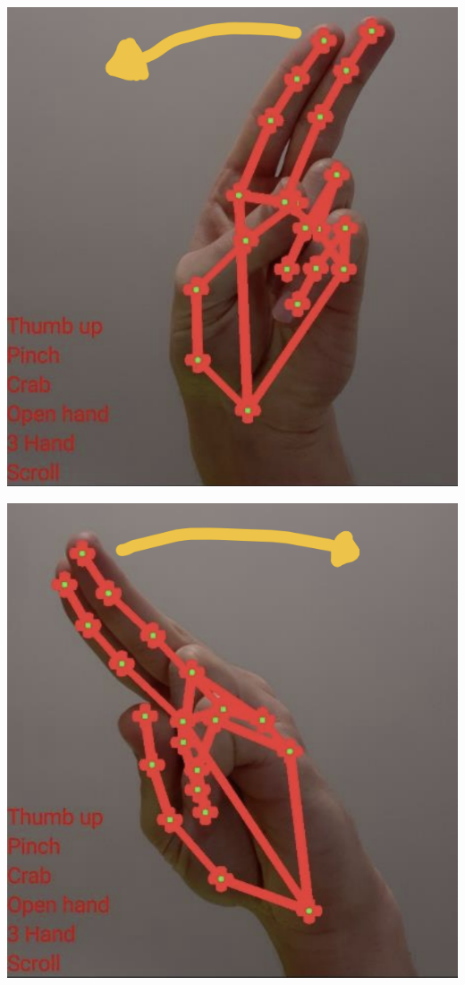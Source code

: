 \begin{multicols}{2}
    \begin{multicolfigure}
        \centering
        \includegraphics[width=\textwidth]{images/scroll_1.png}
    \end{multicolfigure}
    \columnbreak
    \begin{multicolfigure}
        \centering
        \includegraphics[width=\textwidth]{images/scroll_2.png}
    \end{multicolfigure} 
\end{multicols}